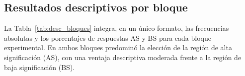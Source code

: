 \documentclass[stu, 12pt, letterpaper, donotrepeattitle, floatsintext, natbib]{apa7}
\begin{document}
\begin{table}[H]
\centering
\caption{Resultados individuales por participante: frecuencia absoluta (AS/BS) y media}
\label{tab:ind_freq}
\end{table}

\begin{table}[H]
\centering
\caption{Resultados individuales por participante: porcentaje de elecciones (AS/BS) y media}
\label{tab:ind_pct}
\end{table}

\subsection{Resultados descriptivos por bloque}

La Tabla~\ref{tab:desc_bloques} integra, en un único formato, las frecuencias absolutas y los porcentajes de respuestas AS y BS para cada bloque experimental. En ambos bloques predominó la elección de la región de alta significación (AS), con una ventaja descriptiva moderada frente a la región de baja significación (BS).
\end{document}
